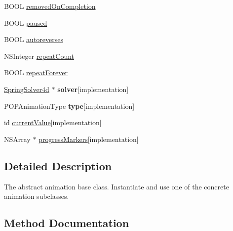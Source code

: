 \begin{DoxyCompactItemize}
B\+O\+OL \mbox{\hyperlink{interface_p_o_p_animation_a9a08ee39f86e903c893cb04ad4eb533d}{removed\+On\+Completion}}
\item 
B\+O\+OL \mbox{\hyperlink{interface_p_o_p_animation_a7ae9bf4e6d712c37d9e70e90079b96bd}{paused}}
\item 
B\+O\+OL \mbox{\hyperlink{interface_p_o_p_animation_a359e335e7c38327db8aa081416e2e90d}{autoreverses}}
\item 
N\+S\+Integer \mbox{\hyperlink{interface_p_o_p_animation_acd4599f0c1d8147acbb6118c8d51ba8b}{repeat\+Count}}
\item 
B\+O\+OL \mbox{\hyperlink{interface_p_o_p_animation_a0f886a54d7411e3b3e1ef78566c0bc30}{repeat\+Forever}}
\item 
\mbox{\label{interface_p_o_p_animation_af3fdf396d4bb8953fa3a7d9bfc499526}} 
\mbox{\hyperlink{class_p_o_p_1_1_spring_solver}{Spring\+Solver4d}} $\ast$ {\bfseries solver}{\ttfamily  \mbox{[}implementation\mbox{]}}
\item 
\mbox{\label{interface_p_o_p_animation_a7dc902af93dccff785e0b7ac004c28a4}} 
P\+O\+P\+Animation\+Type {\bfseries type}{\ttfamily  \mbox{[}implementation\mbox{]}}
\item 
id \mbox{\hyperlink{interface_p_o_p_animation_aa806865c6db615b3dc956ab83ad5108f}{current\+Value}}{\ttfamily  \mbox{[}implementation\mbox{]}}
\item 
N\+S\+Array $\ast$ \mbox{\hyperlink{interface_p_o_p_animation_a0934411549c858c08c34d8de25116437}{progress\+Markers}}{\ttfamily  \mbox{[}implementation\mbox{]}}
\end{DoxyCompactItemize}


\subsection{Detailed Description}
The abstract animation base class.  Instantiate and use one of the concrete animation subclasses. 

\subsection{Method Documentation}
\mbox{\label{interface_p_o_p_animation_a2156e24577e9e6b3dddf47c6b4249e7f}} 
